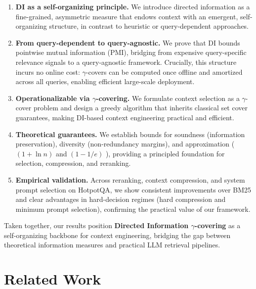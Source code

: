 \documentclass{article} %
\theoremstyle{definition}
\begin{document}
\begin{enumerate}
    \item \textbf{DI as a self-organizing principle.} We introduce directed information as a fine-grained, asymmetric measure that endows context with an emergent, self-organizing structure, in contrast to heuristic or query-dependent approaches.
    \item \textbf{From query-dependent to query-agnostic.} We prove that DI bounds pointwise mutual information (PMI), bridging from expensive query-specific relevance signals to a query-agnostic framework. Crucially, this structure incurs no online cost: $\gamma$-covers can be computed once offline and amortized across all queries, enabling efficient large-scale deployment.
    \item \textbf{Operationalizable via $\gamma$-covering.} We formulate context selection as a $\gamma$-cover problem and design a greedy algorithm that inherits classical set cover guarantees, making DI-based context engineering practical and efficient.
    \item \textbf{Theoretical guarantees.} We establish bounds for soundness (information preservation), diversity (non-redundancy margins), and approximation ( $(1+\ln n)$ and $(1-1/e)$ ), providing a principled foundation for selection, compression, and reranking.
    \item \textbf{Empirical validation.} Across reranking, context compression, and system prompt selection on HotpotQA, we show consistent improvements over BM25 and clear advantages in hard-decision regimes (hard compression and minimum prompt selection), confirming the practical value of our framework.
\end{enumerate}

Taken together, our results position \textbf{Directed Information $\gamma$-covering} as a self-organizing backbone for context engineering, bridging the gap between theoretical information measures and practical LLM retrieval pipelines.


\section{Related Work}
\end{document}
